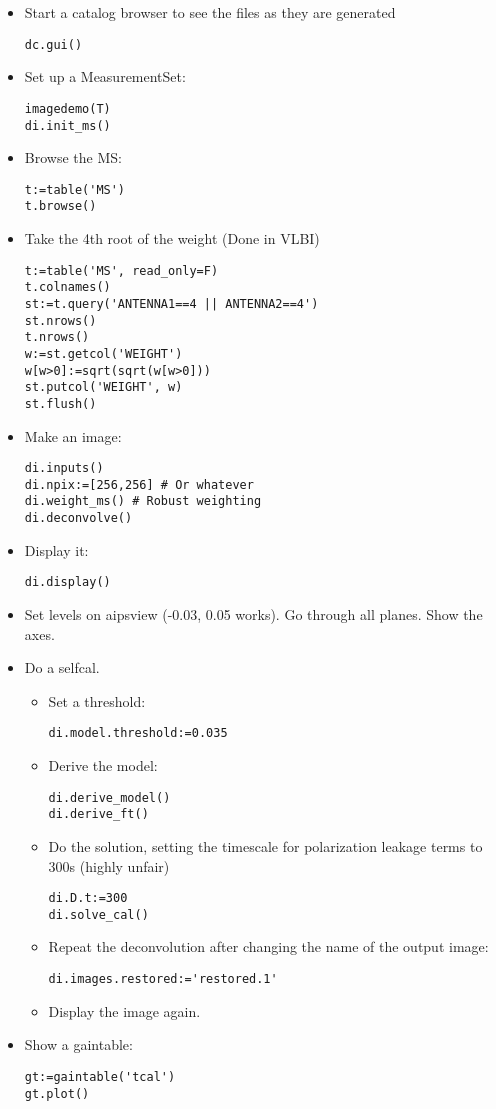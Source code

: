 \begin{itemize}
\item Start a catalog browser to see the files as they are generated
\begin{verbatim}
dc.gui()
\end{verbatim}
\item Set up a MeasurementSet: 
\begin{verbatim}
imagedemo(T)
di.init_ms()
\end{verbatim}
\item Browse the MS: 
\begin{verbatim}
t:=table('MS')
t.browse()
\end{verbatim}
\item Take the 4th root of the weight (Done in VLBI)
\begin{verbatim}
t:=table('MS', read_only=F)
t.colnames()
st:=t.query('ANTENNA1==4 || ANTENNA2==4')
st.nrows()
t.nrows()
w:=st.getcol('WEIGHT')
w[w>0]:=sqrt(sqrt(w[w>0]))
st.putcol('WEIGHT', w)
st.flush()
\end{verbatim}
\item Make an image: 
\begin{verbatim}
di.inputs()
di.npix:=[256,256] # Or whatever
di.weight_ms() # Robust weighting
di.deconvolve()
\end{verbatim}
\item Display it:
\begin{verbatim}
di.display()
\end{verbatim}
\item Set levels on aipsview (-0.03, 0.05 works). Go through all planes. Show the axes.
\item Do a selfcal.
\begin{itemize}
\item Set a threshold: 
\begin{verbatim}
di.model.threshold:=0.035
\end{verbatim}
\item Derive the model: 
\begin{verbatim}
di.derive_model()
di.derive_ft()
\end{verbatim}
\item Do the solution, setting the timescale for polarization leakage
terms to 300s (highly unfair)
\begin{verbatim}
di.D.t:=300
di.solve_cal()
\end{verbatim}
\item Repeat the deconvolution after changing the name of the output
image: 
\begin{verbatim}
di.images.restored:='restored.1'
\end{verbatim}
\item Display the image again.
\end{itemize}
\item Show a gaintable:
\begin{verbatim}
gt:=gaintable('tcal')
gt.plot()
\end{verbatim}
\end{itemize}

